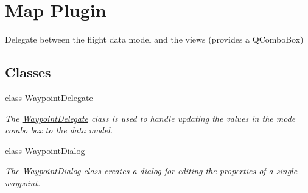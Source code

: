 \hypertarget{group___path_planner}{\section{Map Plugin}
\label{group___path_planner}
}


Delegate between the flight data model and the views (provides a Q\-Combo\-Box)  


\subsection*{Classes}
\begin{DoxyCompactItemize}
\item 
class \hyperlink{class_waypoint_delegate}{Waypoint\-Delegate}
\begin{DoxyCompactList}\small\item\em The \hyperlink{class_waypoint_delegate}{Waypoint\-Delegate} class is used to handle updating the values in the mode combo box to the data model. \end{DoxyCompactList}\item 
class \hyperlink{class_waypoint_dialog}{Waypoint\-Dialog}
\begin{DoxyCompactList}\small\item\em The \hyperlink{class_waypoint_dialog}{Waypoint\-Dialog} class creates a dialog for editing the properties of a single waypoint. \end{DoxyCompactList}\end{DoxyCompactItemize}

